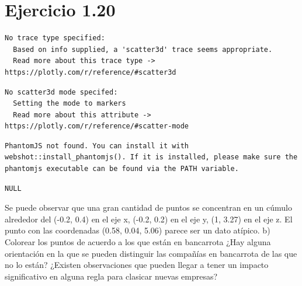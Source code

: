 \documentclass[
]{article}
\newenvironment{Shaded}{\begin{snugshade}}{\end{snugshade}}
\newcommand{\CommentTok}[1]{\textcolor[rgb]{0.56,0.35,0.01}{\textit{#1}}}
\newcommand{\FunctionTok}[1]{\textcolor[rgb]{0.00,0.00,0.00}{#1}}
\newcommand{\NormalTok}[1]{#1}
\newcommand{\OtherTok}[1]{\textcolor[rgb]{0.56,0.35,0.01}{#1}}
\newcommand{\SpecialCharTok}[1]{\textcolor[rgb]{0.00,0.00,0.00}{#1}}
\begin{document}
\hypertarget{ejercicio-1.20}{%
\section{Ejercicio 1.20}\label{ejercicio-1.20}}

\begin{verbatim}
No trace type specified:
  Based on info supplied, a 'scatter3d' trace seems appropriate.
  Read more about this trace type -> https://plotly.com/r/reference/#scatter3d
\end{verbatim}

\begin{verbatim}
No scatter3d mode specifed:
  Setting the mode to markers
  Read more about this attribute -> https://plotly.com/r/reference/#scatter-mode
\end{verbatim}

\begin{verbatim}
PhantomJS not found. You can install it with webshot::install_phantomjs(). If it is installed, please make sure the phantomjs executable can be found via the PATH variable.
\end{verbatim}

\begin{verbatim}
NULL
\end{verbatim}

Se puede observar que una gran cantidad de puntos se concentran en un
cúmulo alrededor del (-0.2, 0.4) en el eje x, (-0.2, 0.2) en el eje y,
(1, 3.27) en el eje z. El punto con las coordenadas (0.58, 0.04, 5.06)
parece ser un dato atípico. b) Colorear los puntos de acuerdo a los que
están en bancarrota ¿Hay alguna orientación en la que se pueden
distinguir las compañías en bancarrota de las que no lo están? ¿Existen
observaciones que pueden llegar a tener un impacto significativo en
alguna regla para clasicar nuevas empresas?

\begin{Shaded}
\end{Shaded}
\end{document}
